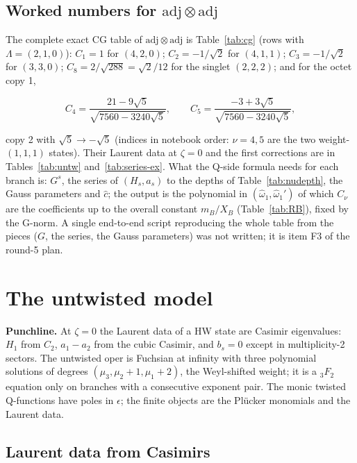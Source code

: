 \documentclass[11pt]{article}
\begin{document}
\subsection{Worked numbers for \texorpdfstring{$\mathrm{adj}\otimes\mathrm{adj}$}{adjadj}}\label{sec:worked}

The complete exact CG table of $\mathrm{adj}\otimes\mathrm{adj}$ is Table~\ref{tab:cg} (rows with $\Lambda=(2,1,0)$): $C_1=1$ for $(4,2,0)$; $C_2=-1/\sqrt2$ for $(4,1,1)$; $C_3=-1/\sqrt2$ for $(3,3,0)$; $C_8=2/\sqrt{288}=\sqrt2/12$ for the singlet $(2,2,2)$; and for the octet copy 1,

\begin{equation}
C_4=\frac{21-9\sqrt5}{\sqrt{7560-3240\sqrt5}},\qquad C_5=\frac{-3+3\sqrt5}{\sqrt{7560-3240\sqrt5}},
\end{equation}

copy 2 with $\sqrt5\to-\sqrt5$ (indices in notebook order: $\nu=4,5$ are the two weight-$(1,1,1)$ states).
Their Laurent data at $\zeta=0$ and the first corrections are in Tables~\ref{tab:untw} and~\ref{tab:series-ex}.
What the Q-side formula needs for each branch is: $G^s$, the series of $(H_s,a_s)$ to the depths of Table~\ref{tab:nudepth}, the Gauss parameters and $\hat c$; the output is the polynomial in $(\hat\omega_1,\hat\omega_1')$ of which $C_\nu$ are the coefficients up to the overall constant $m_B/X_B$ (Table~\ref{tab:RB}), fixed by the G-norm.
A single end-to-end script reproducing the whole table from the pieces ($G$, the series, the Gauss parameters) was not written; it is item F3 of the round-5 plan.

\section{The untwisted model}\label{sec:untwisted}

\textbf{Punchline.} At $\zeta=0$ the Laurent data of a HW state are Casimir eigenvalues: $H_1$ from $C_2$, $a_1-a_2$ from the cubic Casimir, and $b_s=0$ except in multiplicity-2 sectors.
The untwisted oper is Fuchsian at infinity with three polynomial solutions of degrees $(\mu_3,\mu_2+1,\mu_1+2)$, the Weyl-shifted weight; it is a ${}_3F_2$ equation only on branches with a consecutive exponent pair.
The monic twisted Q-functions have poles in $\epsilon$; the finite objects are the Plücker monomials and the Laurent data.

\subsection{Laurent data from Casimirs}\label{sec:casimir}
\end{document}
